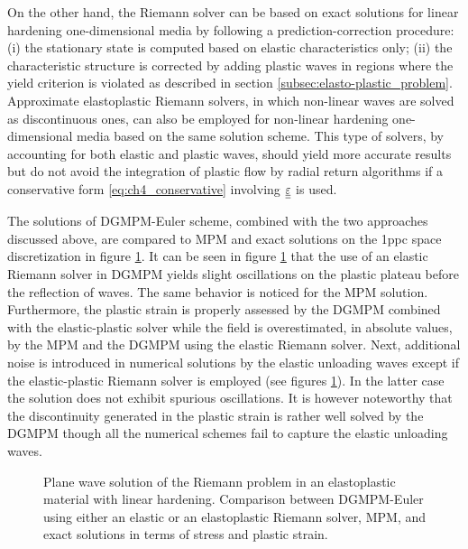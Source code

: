 On the other hand, the Riemann solver can be based on exact solutions for linear hardening one-dimensional media \cite{Thomas_EP,Wang} by following a prediction-correction procedure: (i) the stationary state is computed based on elastic characteristics only; (ii) the characteristic structure is corrected by adding plastic waves in regions where the yield criterion is violated as described in section \ref{subsec:elasto-plastic_problem}.
Approximate elastoplastic Riemann solvers, in which non-linear waves are solved as discontinuous ones, can also be employed for non-linear hardening one-dimensional media based on the same solution scheme.
This type of solvers, by accounting for both elastic and plastic waves, should yield more accurate results but do not avoid the integration of plastic flow by radial return algorithms if a conservative form \eqref{eq:ch4_conservative} involving ${\underline{\underline{\varepsilon}}}$ is used.

The solutions of DGMPM-Euler scheme, combined with the two approaches discussed above, are compared to MPM and exact solutions on the 1ppc space discretization in figure \ref{fig:RP_EP_dgmpm_mpm}.
It can be seen in figure \ref{fig:RP_EP_dgmpm_mpm} that the use of an elastic Riemann solver in DGMPM yields slight oscillations on the plastic plateau before the reflection of waves.
The same behavior is noticed for the MPM solution.
Furthermore, the plastic strain is properly assessed by the DGMPM combined with the elastic-plastic solver while the field is overestimated, in absolute values, by the MPM and the DGMPM using the elastic Riemann solver.
Next, additional noise is introduced in numerical solutions by the elastic unloading waves except if the elastic-plastic Riemann solver is employed (see figures \ref{fig:RP_EP_dgmpm_mpm}).
In the latter case the solution does not exhibit spurious oscillations.
It is however noteworthy that the discontinuity generated in the plastic strain is rather well solved by the DGMPM though all the numerical schemes fail to capture the elastic unloading waves.

\begin{figure}[h!]
  \centering
  { \label{subfig:ep_dgmpm_mpm1}}
  { \label{subfig:ep_dgmpm_mpm3}}
  {}
  \caption{Plane wave solution of the Riemann problem in an elastoplastic material with linear hardening. Comparison between DGMPM-Euler using either an elastic or an elastoplastic Riemann solver, MPM, and exact solutions in terms of stress and plastic strain.}
  \label{fig:RP_EP_dgmpm_mpm}
\end{figure}


